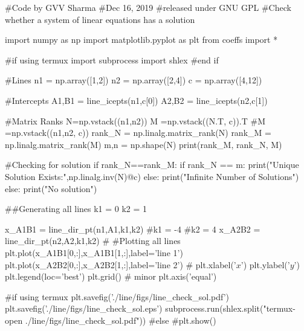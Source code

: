#Code by GVV Sharma
#Dec 16, 2019
#released under GNU GPL
#Check whether a system of linear equations has a solution

import numpy as np
import matplotlib.pyplot as plt
from coeffs import *

#if using termux
import subprocess
import shlex
#end if



#Lines
n1 = np.array([1,2]) 
n2 = np.array([2,4]) 
c =  np.array([4,12]) 

#Intercepts
A1,B1 =  line_icepts(n1,c[0])
A2,B2 =  line_icepts(n2,c[1])


#Matrix Ranks
N=np.vstack((n1,n2))
M =np.vstack((N.T, c)).T
#M =np.vstack((n1,n2, c))
rank_N = np.linalg.matrix_rank(N)
rank_M = np.linalg.matrix_rank(M)
m,n = np.shape(N)
print(rank_M, rank_N, M)

#Checking for solution
if rank_N==rank_M:
	if rank_N == m:
		print("Unique Solution Exists:",np.linalg.inv(N)@c)
	else:
		print("Infinite Number of Solutions")
else:
	print("No solution")

##Generating all lines
k1 = 0
k2 = 1

x_A1B1 =  line_dir_pt(n1,A1,k1,k2)
#k1 = -4
#k2 = 4
x_A2B2 =   line_dir_pt(n2,A2,k1,k2)
#
#Plotting all lines
plt.plot(x_A1B1[0,:],x_A1B1[1,:],label='line 1')
plt.plot(x_A2B2[0,:],x_A2B2[1,:],label='line 2')
#
plt.xlabel('$x$')
plt.ylabel('$y$')
plt.legend(loc='best')
plt.grid() # minor
plt.axis('equal')

#if using termux
plt.savefig('./line/figs/line_check_sol.pdf')
plt.savefig('./line/figs/line_check_sol.eps')
subprocess.run(shlex.split("termux-open ./line/figs/line_check_sol.pdf"))
#else
#plt.show()

